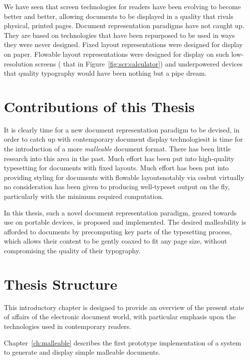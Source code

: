 We have seen that screen technologies for \ebook{} readers have been evolving to become better and better, allowing documents to be displayed in a quality that rivals physical, printed pages. Document representation paradigms have not caught up. They are based on technologies that have been repurposed to be used in ways they were never designed. Fixed layout representations were designed for display on paper. Flowable layout representations were designed for display on such low-resolution screens (\eg{} that in Figure~\ref{fig:scr:calculator}) and underpowered devices that quality typography would have been nothing but a pipe dream.


\section{Contributions of this Thesis}

It is clearly time for a new document representation paradigm to be devised, in order to catch up with contemporary document display technologies\ed it is time for the introduction of a more \emph{malleable} document format. There has been little research into this area in the past. Much effort has been put into high-quality typesetting for documents with fixed layouts. Much effort has been put into providing styling for documents with flowable layouts\ed notably via css\ed but virtually no consideration has been given to producing well-typeset output on the fly, particularly with the minimum required computation.

In this thesis, such a novel document representation paradigm, geared towards use on portable devices, is proposed and implemented. The desired malleability is afforded to documents by precomputing key parts of the typesetting process, which allows their content to be gently coaxed to fit any page size, without compromising the quality of their typography.



\section{Thesis Structure}

This introductory chapter is designed to provide an overview of the present state of affairs of the electronic document world, with particular emphasis upon the technologies used in contemporary \ebook{} readers. 

Chapter~\ref{ch:malleable} describes the first prototype implementation of a system to generate and display simple malleable documents.

